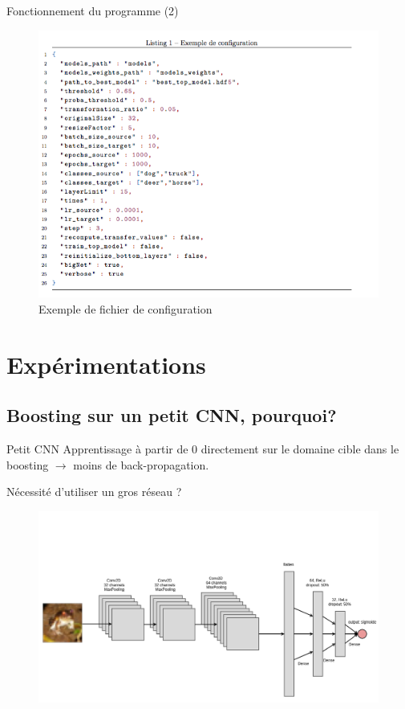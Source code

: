 \documentclass{beamer}
\begin{document}
    \begin{frame}{Fonctionnement du programme (2)}
      \begin{figure}
          \includegraphics[width=.9\textheight]{config.png}
          \caption{Exemple de fichier de configuration}
          \label{Config}
       \end{figure}
    \end{frame}

\section{Expérimentations}
	\subsection{Boosting sur un petit CNN, pourquoi?}
    	\begin{frame}
         \begin{block}{Petit CNN} Apprentissage \`a partir de 0 directement sur le domaine cible dans le boosting
         $\rightarrow$ moins de back-propagation. 
         
         Nécessité d'utiliser un gros réseau ? 
         \end{block}
         
         \begin{figure}
         \includegraphics[width=.9\textwidth]{smallNetDraw.png}
         \end{figure}
     
    	\end{frame}
        
\end{document}
